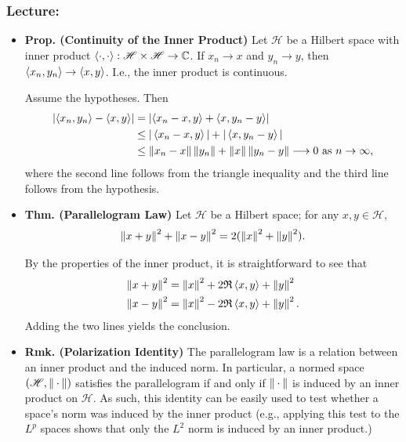 \documentclass{article}
\begin{document}
\subsubsection{Lecture:}
\begin{itemize}
	\item \textbf{Prop. (Continuity of the Inner Product)} Let $\mathscr{H}$ be a Hilbert space with inner product $\braket{\cdot,\cdot}: \mathscr{H}\times \mathscr{H} \to \mathbb{C}$. If $x_{n} \to x$ and $y_{n} \to y$, then $\braket{x_{n}, y_{n}} \to \braket{x,y}$. I.e., the inner product is continuous. \newline 
	\begin{solutions}
		Assume the hypotheses. Then 
		\begin{align}
			\begin{split}
				\left| \braket{x_{n}, y_{n}} - \braket{x,y} \right| &= \left| \braket{x_{n} - x, y} + \braket{x, y_{n} - y} \right| \\
				&\leq |\braket{x_{n} - x, y}| + |\braket{x,y_{n} - y}| \\
				&\leq \left\Vert x_{n} - x \right\Vert\left\Vert y_{n} \right\Vert + \left\Vert x \right\Vert\left\Vert y_{n} - y \right\Vert \longrightarrow 0 \text{ as $n \to \infty$}, 
			\end{split}
		\end{align}
		where the second line follows from the triangle inequality and the third line follows from the hypothesis. 
	\end{solutions}
	\item \textbf{Thm. (Parallelogram Law)} Let $\mathscr{H}$ be a Hilbert space; for any $x, y \in \mathscr{H}$, 
	\begin{equation*}
		\left\Vert x + y \right\Vert^{2} + \left\Vert x - y \right\Vert^{2} = 2(\left\Vert x \right\Vert^{2} + \left\Vert y \right\Vert^{2}).
	\end{equation*}
	\begin{solutions}
		By the properties of the inner product, it is straightforward to see that 
		\begin{align}
			\begin{split} 
				\left\Vert x + y \right\Vert^{2} &= \left\Vert x \right\Vert^{2} + 2\mathfrak{R}\braket{x,y} + \left\Vert y \right\Vert^{2}  \\
				\left\Vert x - y \right\Vert^{2} &= \left\Vert x \right\Vert^{2} -2\mathfrak{R}\braket{x,y} + \left\Vert y \right\Vert^{2}. 
			\end{split} 
		\end{align}
		Adding the two lines yields the conclusion. 
	\end{solutions}
	\item \textbf{Rmk. (Polarization Identity)} The parallelogram law is a relation between an inner product and the induced norm. In particular, a normed space $(\mathscr{H}, \left\Vert \hspace{2pt}\cdot\hspace{2pt} \right\Vert)$ satisfies the parallelogram if and only if $\left\Vert \hspace{2pt}\cdot\hspace{2pt} \right\Vert$ is induced by an inner product on $\mathscr{H}$. As such, this identity can be easily used to test whether a space's norm was induced by the inner product (e.g., applying this test to the $L^{p}$ spaces shows that only the $L^{2}$ norm is induced by an inner product.)	

\end{itemize}
\end{document}
